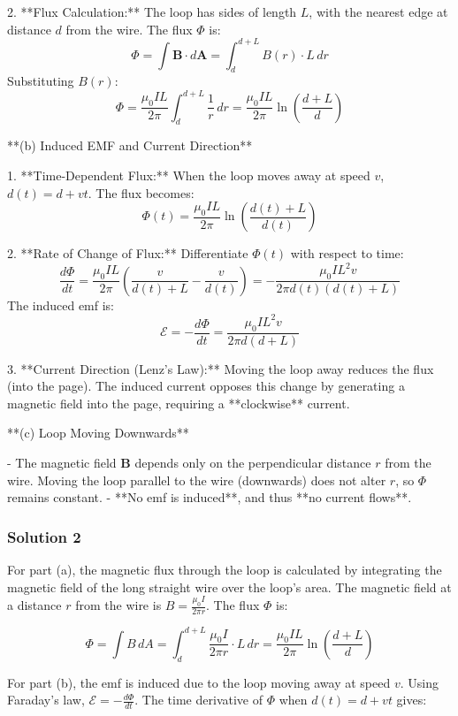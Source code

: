 \documentclass{article}
\begin{document}
2. **Flux Calculation:**  
   The loop has sides of length \( L \), with the nearest edge at distance \( d \) from the wire. The flux \( \Phi \) is:
   \[
   \Phi = \int \mathbf{B} \cdot d\mathbf{A} = \int_{d}^{d+L} B(r) \cdot L \, dr
   \]
   Substituting \( B(r) \):
   \[
   \Phi = \frac{\mu_0 I L}{2\pi} \int_{d}^{d+L} \frac{1}{r} \, dr = \frac{\mu_0 I L}{2\pi} \ln\left(\frac{d + L}{d}\right)
   \]

**(b) Induced EMF and Current Direction**

1. **Time-Dependent Flux:**  
   When the loop moves away at speed \( v \), \( d(t) = d + vt \). The flux becomes:
   \[
   \Phi(t) = \frac{\mu_0 I L}{2\pi} \ln\left(\frac{d(t) + L}{d(t)}\right)
   \]

2. **Rate of Change of Flux:**  
   Differentiate \( \Phi(t) \) with respect to time:
   \[
   \frac{d\Phi}{dt} = \frac{\mu_0 I L}{2\pi} \left( \frac{v}{d(t) + L} - \frac{v}{d(t)} \right) = -\frac{\mu_0 I L^2 v}{2\pi d(t)(d(t) + L)}
   \]
   The induced emf is:
   \[
   \mathcal{E} = -\frac{d\Phi}{dt} = \frac{\mu_0 I L^2 v}{2\pi d(d + L)}
   \]

3. **Current Direction (Lenz's Law):**  
   Moving the loop away reduces the flux (into the page). The induced current opposes this change by generating a magnetic field into the page, requiring a **clockwise** current.

**(c) Loop Moving Downwards**

- The magnetic field \( \mathbf{B} \) depends only on the perpendicular distance \( r \) from the wire. Moving the loop parallel to the wire (downwards) does not alter \( r \), so \( \Phi \) remains constant.  
- **No emf is induced**, and thus **no current flows**.

\subsubsection{Solution 2}
For part (a), the magnetic flux through the loop is calculated by integrating the magnetic field of the long straight wire over the loop's area. The magnetic field at a distance \( r \) from the wire is \( B = \frac{\mu_0 I}{2\pi r} \). The flux \( \Phi \) is:

\[
\Phi = \int B \, dA = \int_{d}^{d+L} \frac{\mu_0 I}{2\pi r} \cdot L \, dr = \frac{\mu_0 I L}{2\pi} \ln\left(\frac{d + L}{d}\right)
\]

For part (b), the emf is induced due to the loop moving away at speed \( v \). Using Faraday's law, \( \mathcal{E} = -\frac{d\Phi}{dt} \). The time derivative of \( \Phi \) when \( d(t) = d + vt \) gives:
\end{document}
